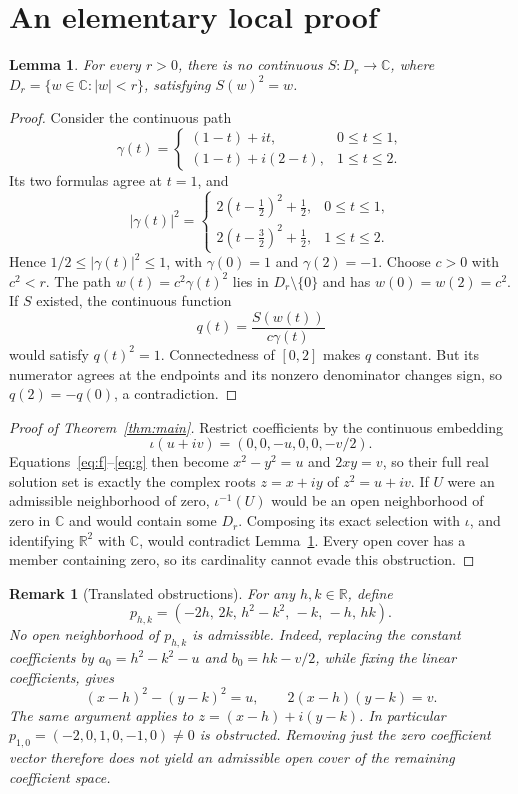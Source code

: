 \documentclass[11pt]{article}
\newtheorem{lemma}{Lemma}
\newtheorem{remark}{Remark}
\newcommand{\R}{\mathbb R}
\newcommand{\C}{\mathbb C}
\begin{document}
\section{An elementary local proof}
\begin{lemma}\label{lem:square}
For every \(r>0\), there is no continuous \(S:D_r\to\C\), where
\(D_r=\{w\in\C:|w|<r\}\), satisfying \(S(w)^2=w\).
\end{lemma}
\begin{proof}
Consider the continuous path
\[
 \gamma(t)=
 \begin{cases}
 (1-t)+it,&0\leq t\leq1,\\
 (1-t)+i(2-t),&1\leq t\leq2.
 \end{cases}
\]
Its two formulas agree at \(t=1\), and
\[
 |\gamma(t)|^2=
 \begin{cases}
 2(t-\tfrac12)^2+\tfrac12,&0\leq t\leq1,\\
 2(t-\tfrac32)^2+\tfrac12,&1\leq t\leq2.
 \end{cases}
\]
Hence \(1/2\leq|\gamma(t)|^2\leq1\), with
\(\gamma(0)=1\) and \(\gamma(2)=-1\).
Choose \(c>0\) with \(c^2<r\). The path
\(w(t)=c^2\gamma(t)^2\) lies in \(D_r\setminus\{0\}\) and has
\(w(0)=w(2)=c^2\). If \(S\) existed, the continuous function
\[
 q(t)=\frac{S(w(t))}{c\gamma(t)}
\]
would satisfy \(q(t)^2=1\). Connectedness of \([0,2]\) makes \(q\)
constant. But its numerator agrees at the endpoints and its nonzero
denominator changes sign, so \(q(2)=-q(0)\), a contradiction.
\end{proof}

\begin{proof}[Proof of Theorem~\ref{thm:main}]
Restrict coefficients by the continuous embedding
\[
 \iota(u+iv)=(0,0,-u,0,0,-v/2).
\]
Equations~\eqref{eq:f}--\eqref{eq:g} then become
\(x^2-y^2=u\) and \(2xy=v\), so their full real solution set is
exactly the complex roots \(z=x+iy\) of \(z^2=u+iv\).
If \(U\) were an admissible neighborhood of zero, \(\iota^{-1}(U)\)
would be an open neighborhood of zero in \(\C\) and would contain
some \(D_r\). Composing its exact selection with \(\iota\), and
identifying \(\R^2\) with \(\C\), would contradict
Lemma~\ref{lem:square}. Every open cover has a member containing zero,
so its cardinality cannot evade this obstruction.
\end{proof}

\begin{remark}[Translated obstructions]\label{rem:translated}
For any \(h,k\in\R\), define
\[
 p_{h,k}=(-2h,\,2k,\,h^2-k^2,\,-k,\,-h,\,hk).
\]
No open neighborhood of \(p_{h,k}\) is admissible. Indeed, replacing
the constant coefficients by \(a_0=h^2-k^2-u\) and
\(b_0=hk-v/2\), while fixing the linear coefficients, gives
\[
 (x-h)^2-(y-k)^2=u,\qquad 2(x-h)(y-k)=v.
\]
The same argument applies to \(z=(x-h)+i(y-k)\).
In particular \(p_{1,0}=(-2,0,1,0,-1,0)\neq0\) is obstructed.
Removing just the zero coefficient vector therefore does not yield
an admissible open cover of the remaining coefficient space.
\end{remark}
\end{document}

